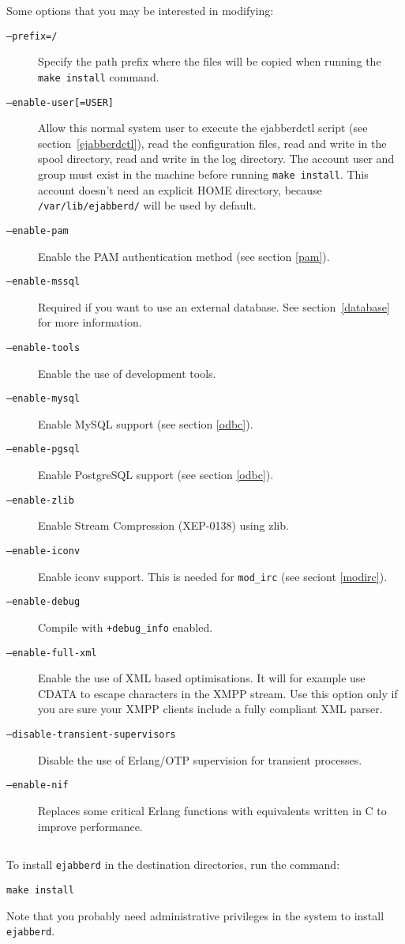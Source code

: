 \documentclass[a4paper,10pt]{book}
\newcommand{\ind}[1]{\begin{latexonly}\index{#1}\end{latexonly}}
\newcommand{\makesubsection}[2]{ \aname{#1}{} \subsection{\ahrefloc{#1}{#2}} \label{#1} }
\newcommand{\bracehack}{\def\{{\char"7B}\def\}{\char"7D}}
\newcommand{\titem}[1]{\item[\bracehack\texttt{#1}]}
\newcommand{\term}[1]{\texttt{#1}}
\newcommand{\ejabberd}{\texttt{ejabberd}}
\begin{document}
Some options that you may be interested in modifying:
\begin{description}
	\titem{--prefix=/}
	Specify the path prefix where the files will be copied when running
	the \term{make install} command.

	\titem{--enable-user[=USER]}
	Allow this normal system user to execute the ejabberdctl script
	(see section~\ref{ejabberdctl}),
	read the configuration files,
	read and write in the spool directory,
	read and write in the log directory.
	The account user and group must exist in the machine
	before running \term{make install}.
	This account doesn't need an explicit HOME directory, because
	\term{/var/lib/ejabberd/} will be used by default.

	\titem{--enable-pam}
	Enable the PAM authentication method (see section \ref{pam}).

	\titem{--enable-mssql}
	Required if you want to use an external database.
	See section~\ref{database} for more information.

        \titem{--enable-tools}
        Enable the use of development tools.

        \titem{--enable-mysql}
        Enable MySQL support (see section \ref{odbc}).

        \titem{--enable-pgsql}
        Enable PostgreSQL support (see section \ref{odbc}).

        \titem{--enable-zlib}
        Enable Stream Compression (XEP-0138) using zlib.

        \titem{--enable-iconv}
        Enable iconv support. This is needed for \term{mod\_irc} (see seciont \ref{modirc}).

        \titem{--enable-debug}
        Compile with \term{+debug\_info} enabled.

	\titem{--enable-full-xml}
	Enable the use of XML based optimisations.
	It will for example use CDATA to escape characters in the XMPP stream.
	Use this option only if you are sure your XMPP clients include a fully compliant XML parser.

	\titem{--disable-transient-supervisors}
	Disable the use of Erlang/OTP supervision for transient processes.

	\titem{--enable-nif}
        Replaces some critical Erlang functions with equivalents written in C to improve performance.
\end{description}

\makesubsection{install}{Install}
\ind{install!install}

To install \ejabberd{} in the destination directories, run the command:
\begin{verbatim}
make install
\end{verbatim}
Note that you probably need administrative privileges in the system
to install \term{ejabberd}.
\end{document}
